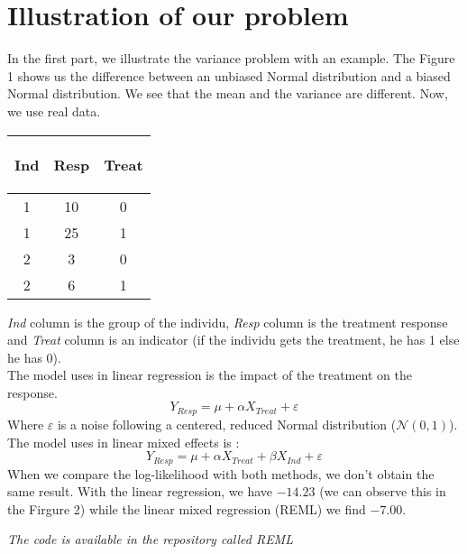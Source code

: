 \documentclass{article}
\begin{document}
\section{Illustration of our problem}
In the first part, we illustrate the variance problem with an example. 
The Figure 1 shows us the difference between an unbiased Normal distribution and a biased Normal distribution. We see that the mean and the variance are different.
Now, we use real data.\\
\begin{table}[h!]
        \centering
        \begin{tabular}{| c | c | c|}
        \hline
        \begin{bf} Ind \end{bf} &
        \begin{bf} Resp \end{bf} &
        \begin{bf} Treat \end{bf} \\
        \hline
        1 &  10 & 0\\
        1 & 25 & 1 \\
        2 & 3 & 0 \\
        2 &  6 & 1\\
        \hline
        \end{tabular}
\end{table}
\textit{Ind} column is the group of the individu, \textit{Resp} column is the treatment response and \textit{Treat} column is an indicator (if the individu gets the treatment, he has 1 else he has 0).\\
The model uses in linear regression is the impact of the treatment on the response.
\begin{equation*}
    Y_{Resp} = \mu +  \alpha X_{Treat} + \varepsilon
\end{equation*}
Where $\varepsilon$ is a noise following a centered, reduced Normal distribution ($\mathcal{N}(0, 1)$).\\
The model uses in linear mixed effects is :
\begin{equation*}
    Y_{Resp} = \mu + \alpha X_{Treat}  + \beta X_{Ind} +\varepsilon
\end{equation*}
When we compare the log-likelihood with both methods, we don't obtain the same result.
With the linear regression, we have $-14.23$ (we can observe this in the Firgure 2) while the linear mixed regression (REML) we find $-7.00$.\\
\begin{remark}
\textit{The code is available in the repository called REML}
\end{remark}
\end{document}
